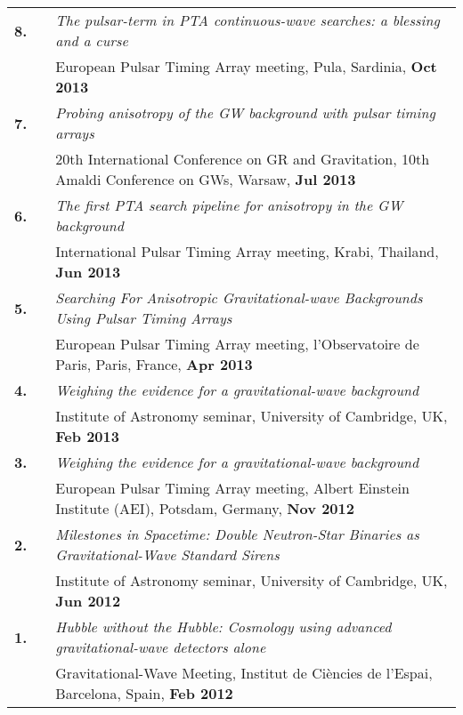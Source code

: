 \documentclass[11pt,letterpaper,sans]{moderncv}
\begin{document}
{\begin{longtable}{rp{0.3cm}p{15.8cm}}
\textbf{8.} & & \textit{The pulsar-term in PTA continuous-wave searches: a blessing and a curse} \\ 
&& European Pulsar Timing Array meeting, Pula, Sardinia, \textbf{Oct 2013} \vspace{0.09cm}\\
\textbf{7.} & & \textit{Probing anisotropy of the GW background with pulsar timing arrays} \\ 
&& 20th International Conference on GR and Gravitation, 10th Amaldi Conference on GWs, Warsaw, \textbf{Jul 2013} \vspace{0.09cm}\\
\textbf{6.} & & \textit{The first PTA search pipeline for anisotropy in the GW background} \\ 
&& International Pulsar Timing Array meeting, Krabi, Thailand, \textbf{Jun 2013} \vspace{0.09cm}\\
\textbf{5.} & & \textit{Searching For Anisotropic Gravitational-wave Backgrounds Using Pulsar Timing Arrays} \\ 
&& European Pulsar Timing Array meeting, l'Observatoire de Paris, Paris, France, \textbf{Apr 2013} \vspace{0.09cm}\\
\textbf{4.} & & \textit{Weighing the evidence for a gravitational-wave background} \\ 
&& Institute of Astronomy seminar, University of Cambridge, UK, \textbf{Feb 2013} \vspace{0.09cm}\\
\textbf{3.} & & \textit{Weighing the evidence for a gravitational-wave background} \\ 
&& European Pulsar Timing Array meeting, Albert Einstein Institute (AEI), Potsdam, Germany, \textbf{Nov 2012} \vspace{0.09cm}\\
\textbf{2.} & & \textit{Milestones in Spacetime: Double Neutron-Star Binaries as Gravitational-Wave Standard Sirens} \\ 
&& Institute of Astronomy seminar, University of Cambridge, UK, \textbf{Jun 2012} \vspace{0.09cm}\\
\textbf{1.} & & \textit{Hubble without the Hubble: Cosmology using advanced gravitational-wave detectors alone} \\ 
&& Gravitational-Wave Meeting, Institut de Ci\`encies de l'Espai, Barcelona, Spain, \textbf{Feb 2012} 
\end{longtable}
}
\end{document}
